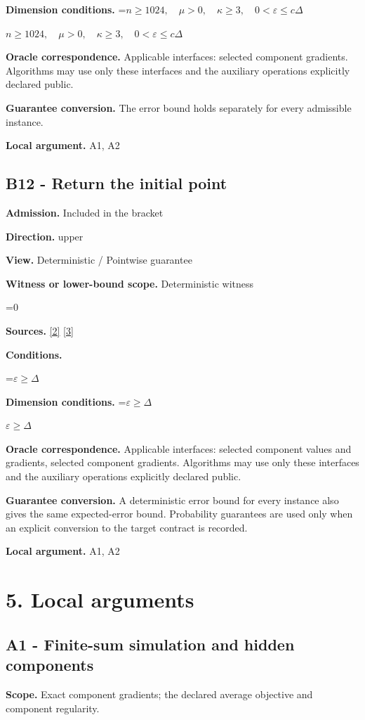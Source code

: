 \documentclass[10pt,a4paper]{article}
\newcommand{\AtlasMath}[1]{\par\begingroup\centering\setbox0=\hbox{$\displaystyle #1$}\ifdim\wd0>1.4\linewidth\typeout{ATLAS WIDE FORMULA: \the\wd0}\fi\ifdim\wd0>\linewidth\resizebox{\linewidth}{!}{\box0}\else\box0\fi\par\endgroup}
\newcommand{\AtlasInlineMath}[1]{\begingroup\setbox0=\hbox{$#1$}\ifdim\wd0>.4\linewidth\endgroup\AtlasMath{#1}\else\endgroup$#1$\fi}
\begin{document}
\textbf{Dimension conditions.} \AtlasInlineMath{n\ge1024,\quad\mu>0,\quad\kappa\ge3,\quad0<\varepsilon\le c\Delta}

\textbf{Oracle correspondence.} Applicable interfaces: selected component gradients. Algorithms may use only these interfaces and the auxiliary operations explicitly declared public.

\textbf{Guarantee conversion.} The error bound holds separately for every admissible instance.

\textbf{Local argument.} A1, A2

\subsection{B12 - Return the initial point}
\textbf{Admission.} Included in the bracket

\textbf{Direction.} upper

\textbf{View.} Deterministic / Pointwise guarantee

\textbf{Witness or lower-bound scope.} Deterministic witness

\AtlasMath{0}
\textbf{Sources.} \href{https://proceedings.mlr.press/v97/zhou19b/zhou19b.pdf}{[2]} \href{https://arxiv.org/pdf/1405.4980}{[3]}

\textbf{Conditions.} 
\AtlasMath{\varepsilon\ge\Delta}


\textbf{Dimension conditions.} \AtlasInlineMath{\varepsilon\ge\Delta}

\textbf{Oracle correspondence.} Applicable interfaces: selected component values and gradients, selected component gradients. Algorithms may use only these interfaces and the auxiliary operations explicitly declared public.

\textbf{Guarantee conversion.} A deterministic error bound for every instance also gives the same expected-error bound. Probability guarantees are used only when an explicit conversion to the target contract is recorded.

\textbf{Local argument.} A1, A2

\section{5. Local arguments}
\subsection{A1 - Finite-sum simulation and hidden components}
\textbf{Scope.} Exact component gradients; the declared average objective and component regularity.
\end{document}
